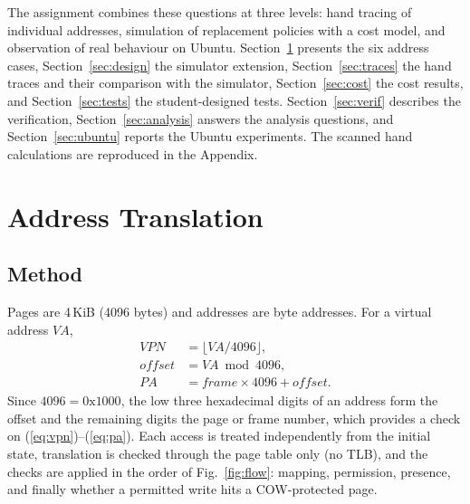 \documentclass[conference,a4paper]{IEEEtran}
\begin{document}
The assignment \cite{handout} combines these questions at three levels: hand tracing of individual addresses, simulation of replacement policies with a cost model, and observation of real behaviour on Ubuntu. Section~\ref{sec:addr} presents the six address cases, Section~\ref{sec:design} the simulator extension, Section~\ref{sec:traces} the hand traces and their comparison with the simulator, Section~\ref{sec:cost} the cost results, and Section~\ref{sec:tests} the student-designed tests. Section~\ref{sec:verif} describes the verification, Section~\ref{sec:analysis} answers the analysis questions, and Section~\ref{sec:ubuntu} reports the Ubuntu experiments. The scanned hand calculations are reproduced in the Appendix.

\section{Address Translation}\label{sec:addr}
\subsection{Method}
Pages are 4\,KiB (4096 bytes) and addresses are byte addresses. For a virtual address $VA$,
\begin{align}
\mathit{VPN} &= \lfloor VA / 4096 \rfloor, \label{eq:vpn}\\
\mathit{offset} &= VA \bmod 4096, \label{eq:off}\\
PA &= \mathit{frame} \times 4096 + \mathit{offset}. \label{eq:pa}
\end{align}
Since $4096 = \mathrm{0x1000}$, the low three hexadecimal digits of an address form the offset and the remaining digits the page or frame number, which provides a check on (\ref{eq:vpn})--(\ref{eq:pa}). Each access is treated independently from the initial state, translation is checked through the page table only (no TLB), and the checks are applied in the order of Fig.~\ref{fig:flow}: mapping, permission, presence, and finally whether a permitted write hits a COW-protected page.
\end{document}
